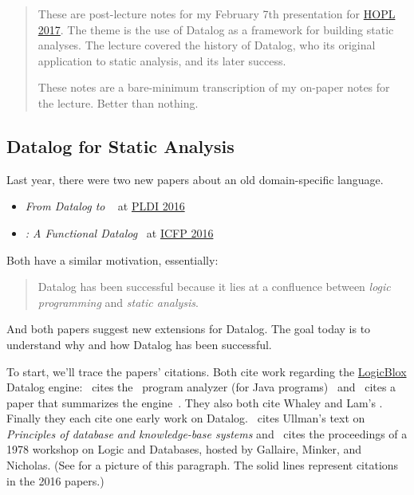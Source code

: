 \documentclass{article}
\begin{document}

\begin{abstract}
These are post-lecture notes for my February 7th presentation for \href{http://www.ccs.neu.edu/home/matthias/7480-s17/index.html}{HOPL 2017}.
The theme is the use of Datalog as a framework for building static analyses.
The lecture covered the history of Datalog, who its original application to static analysis, and its later success.

These notes are a bare-minimum transcription of my on-paper notes for the lecture. Better than nothing.
\end{abstract}

\subsection*{Datalog for Static Analysis}

Last year, there were two new papers about an old domain-specific language.

\begin{itemize}
\item
{\emph{From Datalog to \flix}~\cite{myl-pldi-2016} at \href{http://conf.researchr.org/home/pldi-2016}{PLDI 2016}}
\item
{\emph{\datafun{}: A Functional Datalog}~\cite{ak-icfp-2016} at \href{http://conf.researchr.org/home/icfp-2016}{ICFP 2016}}
\end{itemize}
Both have a similar motivation, essentially:

\begin{quote}
  Datalog has been successful because it lies at a confluence between \emph{logic programming} and \emph{static analysis}.
\end{quote}
And both papers suggest new extensions for Datalog.
The goal today is to understand why and how Datalog has been successful.

To start, we'll trace the papers' citations.
Both cite work regarding the \href{http://www.logicblox.com/}{LogicBlox} Datalog engine: \flix\ cites the \doop\ program analyzer (for Java programs)~\cite{bs-oopsla-2009} and \datafun\ cites a paper that summarizes the engine~\cite{acgkopvw-sigmod-2015}.
They also both cite Whaley and Lam's \bddbddb{}.
Finally they each cite one early work on Datalog.
\flix\ cites Ullman's text on \emph{Principles of database and knowledge-base systems} and \datafun\ cites the proceedings of a 1978 workshop on Logic and Databases, hosted by Gallaire, Minker, and Nicholas.
(See  for a picture of this paragraph.
The solid lines represent citations in the 2016 papers.)
\end{document}
